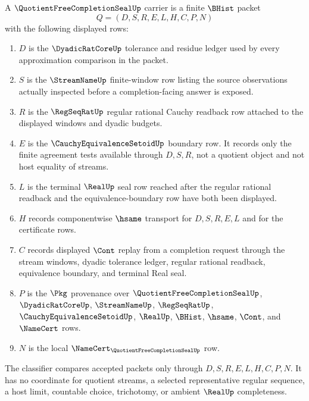 \begin{definition}
\label{def:quotient-free-completion-seal-carrier}
A $\QuotientFreeCompletionSealUp$ carrier is a finite $\BHist$ packet
$$
Q=(D,S,R,E,L,H,C,P,N)
$$
with the following displayed rows:
\begin{enumerate}
\item $D$ is the $\DyadicRatCoreUp$ tolerance and residue ledger used by every approximation comparison in the packet.
\item $S$ is the $\StreamNameUp$ finite-window row listing the source observations actually inspected before a completion-facing answer is exposed.
\item $R$ is the $\RegSeqRatUp$ regular rational Cauchy readback row attached to the displayed windows and dyadic budgets.
\item $E$ is the $\CauchyEquivalenceSetoidUp$ boundary row. It records only the finite agreement tests available through $D,S,R$, not a quotient object and not host equality of streams.
\item $L$ is the terminal $\RealUp$ seal row reached after the regular rational readback and the equivalence-boundary row have both been displayed.
\item $H$ records componentwise $\hsame$ transport for $D,S,R,E,L$ and for the certificate rows.
\item $C$ records displayed $\Cont$ replay from a completion request through the stream windows, dyadic tolerance ledger, regular rational readback, equivalence boundary, and terminal Real seal.
\item $P$ is the $\Pkg$ provenance over $\QuotientFreeCompletionSealUp$, $\DyadicRatCoreUp$, $\StreamNameUp$, $\RegSeqRatUp$, $\CauchyEquivalenceSetoidUp$, $\RealUp$, $\BHist$, $\hsame$, $\Cont$, and $\NameCert$ rows.
\item $N$ is the local $\NameCert_{\QuotientFreeCompletionSealUp}$ row.
\end{enumerate}
The classifier compares accepted packets only through $D,S,R,E,L,H,C,P,N$. It has no coordinate for quotient streams, a selected representative regular sequence, a host limit, countable choice, trichotomy, or ambient $\RealUp$ completeness.
\end{definition}

